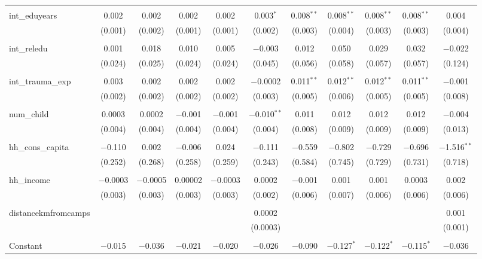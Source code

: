 \begin{table}[H]
\begin{tabular}{@{\extracolsep{4pt}}lcccccccccc}
  & & & & & & & & & & \\ 
 int\_eduyears & 0.002 & 0.002 & 0.002 & 0.002 & 0.003$^{*}$ & 0.008$^{**}$ & 0.008$^{**}$ & 0.008$^{**}$ & 0.008$^{**}$ & 0.004 \\ 
  & (0.001) & (0.002) & (0.001) & (0.001) & (0.002) & (0.003) & (0.004) & (0.003) & (0.003) & (0.004) \\ 
  & & & & & & & & & & \\ 
 int\_reledu & 0.001 & 0.018 & 0.010 & 0.005 & $-$0.003 & 0.012 & 0.050 & 0.029 & 0.032 & $-$0.022 \\ 
  & (0.024) & (0.025) & (0.024) & (0.024) & (0.045) & (0.056) & (0.058) & (0.057) & (0.057) & (0.124) \\ 
  & & & & & & & & & & \\ 
 int\_trauma\_exp & 0.003 & 0.002 & 0.002 & 0.002 & $-$0.0002 & 0.011$^{**}$ & 0.012$^{**}$ & 0.012$^{**}$ & 0.011$^{**}$ & $-$0.001 \\ 
  & (0.002) & (0.002) & (0.002) & (0.002) & (0.003) & (0.005) & (0.006) & (0.005) & (0.005) & (0.008) \\ 
  & & & & & & & & & & \\ 
 num\_child & 0.0003 & 0.0002 & $-$0.001 & $-$0.001 & $-$0.010$^{**}$ & 0.011 & 0.012 & 0.012 & 0.012 & $-$0.004 \\ 
  & (0.004) & (0.004) & (0.004) & (0.004) & (0.004) & (0.008) & (0.009) & (0.009) & (0.009) & (0.013) \\ 
  & & & & & & & & & & \\ 
 hh\_cons\_capita & $-$0.110 & 0.002 & $-$0.006 & 0.024 & $-$0.111 & $-$0.559 & $-$0.802 & $-$0.729 & $-$0.696 & $-$1.516$^{**}$ \\ 
  & (0.252) & (0.268) & (0.258) & (0.259) & (0.243) & (0.584) & (0.745) & (0.729) & (0.731) & (0.718) \\ 
  & & & & & & & & & & \\ 
 hh\_income & $-$0.0003 & $-$0.0005 & 0.00002 & $-$0.0003 & 0.0002 & $-$0.001 & 0.001 & 0.001 & 0.0003 & 0.002 \\ 
  & (0.003) & (0.003) & (0.003) & (0.003) & (0.002) & (0.006) & (0.007) & (0.006) & (0.006) & (0.006) \\ 
  & & & & & & & & & & \\ 
 distancekmfromcamps &  &  &  &  & 0.0002 &  &  &  &  & 0.001 \\ 
  &  &  &  &  & (0.0003) &  &  &  &  & (0.001) \\ 
  & & & & & & & & & & \\ 
 Constant & $-$0.015 & $-$0.036 & $-$0.021 & $-$0.020 & $-$0.026 & $-$0.090 & $-$0.127$^{*}$ & $-$0.122$^{*}$ & $-$0.115$^{*}$ & $-$0.036 \\ 

\end{tabular}
\end{table}
